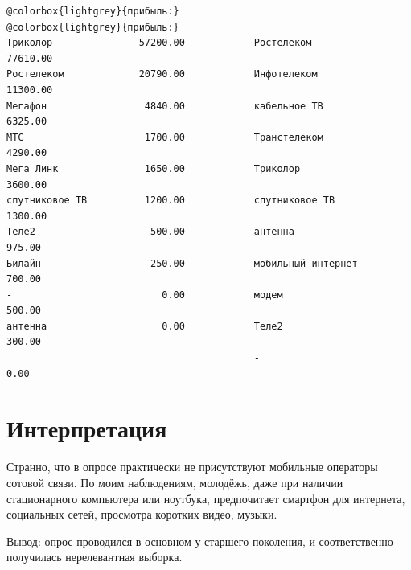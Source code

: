 \documentclass[unicode, 12pt, a4paper,oneside,fleqn]{article}
\begin{document}
\begin{Verbatim}[commandchars=@\{\}]
@colorbox{lightgrey}{прибыль:}                                  @colorbox{lightgrey}{прибыль:}
Триколор               57200.00            Ростелеком             77610.00 
Ростелеком             20790.00            Инфотелеком            11300.00 
Мегафон                 4840.00            кабельное ТВ            6325.00 
МТС                     1700.00            Транстелеком            4290.00 
Мега Линк               1650.00            Триколор                3600.00 
спутниковое ТВ          1200.00            спутниковое ТВ          1300.00 
Теле2                    500.00            антенна                  975.00 
Билайн                   250.00            мобильный интернет       700.00 
-                          0.00            модем                    500.00 
антенна                    0.00            Теле2                    300.00 
                                           -                          0.00 
\end{Verbatim}

\newpage
\section{Интерпретация}
Странно, что в опросе практически не присутствуют мобильные операторы
сотовой связи. По моим наблюдениям, молодёжь, даже при наличии
стационарного компьютера или ноутбука, предпочитает смартфон для
интернета, социальных сетей, просмотра коротких видео, музыки.

Вывод: опрос проводился в основном у старшего поколения, и
соответственно получилась нерелевантная выборка.
\end{document}
